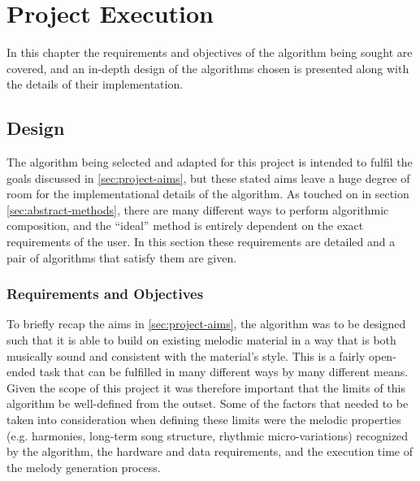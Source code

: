 \documentclass[ author={Stephen Livermore-Tozer},
				supervisor={Dr. Peter Flach},
				degree={MEng},
				title={Algorithmic Co-composition Using Machine Learning},
				subtitle={},
				type={research},
				year={2016} ]{dissertation}
\begin{document}
	
	
	\chapter{Project Execution}
	\label{chap:execution}
	
	In this chapter the requirements and objectives of the algorithm being sought are covered, and an in-depth design of the algorithms chosen is presented along with the details of their implementation.
	
%	
	
	\section{Design}
	
	The algorithm being selected and adapted for this project is intended to fulfil the goals discussed in \ref{sec:project-aims}, but these stated aims leave a huge degree of room for the implementational details of the algorithm. As touched on in section \ref{sec:abstract-methods}, there are many different ways to perform algorithmic composition, and the ``ideal'' method is entirely dependent on the exact requirements of the user. In this section these requirements are detailed and a pair of algorithms that satisfy them are given. 
	
	\subsection{Requirements and Objectives}
	
	To briefly recap the aims in \ref{sec:project-aims}, the algorithm was to be designed such that it is able to build on existing melodic material in a way that is both musically sound and consistent with the material's style. This is a fairly open-ended task that can be fulfilled in many different ways by many different means. Given the scope of this project it was therefore important that the limits of this algorithm be well-defined from the outset. Some of the factors that needed to be taken into consideration when defining these limits were the melodic properties (e.g. harmonies, long-term song structure, rhythmic micro-variations) recognized by the algorithm, the hardware and data requirements, and the execution time of the melody generation process. 
	
\end{document}
